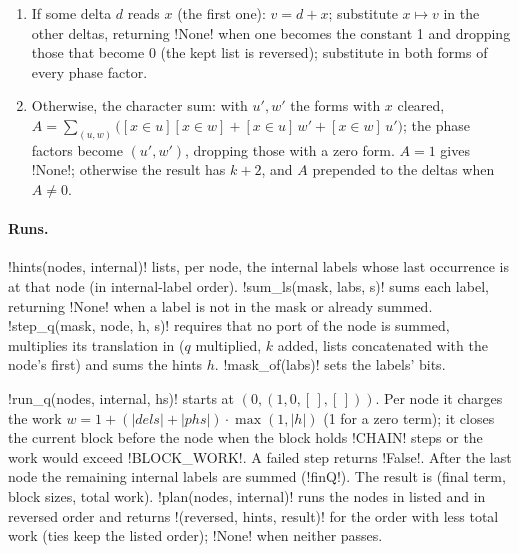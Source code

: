 {{{\begin{algorithm}\label{alg:lean-export-f2-sum}
\begin{enumerate}
\item If some delta $d$ reads $x$ (the first one): $v = d + x$; substitute $x\mapsto v$ in the
other deltas, returning \lexpy!None! when one becomes the constant 1 and dropping those that become
0 (the kept list is reversed); substitute in both forms of every phase factor.
\item Otherwise, the character sum: with $u', w'$ the forms with $x$ cleared,
$A = \sum_{(u,w)} \big([x\in u][x\in w] + [x\in u]\,w' + [x\in w]\,u'\big)$; the phase factors
become $(u', w')$, dropping those with a zero form. $A = 1$ gives \lexpy!None!; otherwise the
result has $k+2$, and $A$ prepended to the deltas when $A\ne 0$.
\end{enumerate}
\end{algorithm}

\paragraph{Runs.} \lexpy!hints(nodes, internal)! lists, per node, the internal labels whose last
occurrence is at that node (in internal-label order). \lexpy!sum_ls(mask, labs, s)! sums each label,
returning \lexpy!None! when a label is not in the mask or already summed. \lexpy!step_q(mask, node, h, s)! requires that no port of the node is summed, multiplies its translation in
($q$ multiplied, $k$ added, lists concatenated with the node's first) and sums the hints $h$.
\lexpy!mask_of(labs)! sets the labels' bits.

\begin{algorithm}\label{alg:lean-export-f2-run}
\lexpy!run_q(nodes, internal, hs)! starts at $(0, (1, 0, [\,], [\,]))$. Per node it charges the
work $w = 1 + (|\mathit{dels}|+|\mathit{phs}|)\cdot\max(1, |h|)$ (1 for a zero term); it closes
the current block before the node when the block holds \lexpy!CHAIN! steps or the work would exceed
\lexpy!BLOCK_WORK!. A failed step returns \lexpy!False!. After the last node the remaining internal
labels are summed (\lexlean!finQ!). The result is (final term, block sizes, total work).
\lexpy!plan(nodes, internal)! runs the nodes in listed and in reversed order and returns
\lexpy!(reversed, hints, result)! for the order with less total work (ties keep the listed order);
\lexpy!None! when neither passes.
\end{algorithm}

}}}
